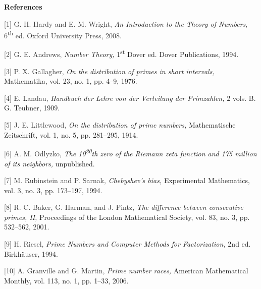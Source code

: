 \documentclass{article}
\begin{document}
\begin{flushleft}
\textbf{References}
\vspace{1\baselineskip}

\textcolor[HTML]{333333}{[1] G. H. Hardy and E. M. Wright, }\textit{An Introduction to the Theory of Numbers}\textcolor[HTML]{333333}{, 6\textsuperscript{th} ed. Oxford University Press, 2008. }

\vspace{1\baselineskip}

\textcolor[HTML]{333333}{[2] G. E. Andrews, }\textit{Number Theory, }1\textsuperscript{st} Dover ed. Dover Publications, 1994.

\vspace{1\baselineskip}

\textcolor[HTML]{333333}{[3] P. X. Gallagher, }\textit{On the distribution of primes in short intervals,} Mathematika, vol. 23, no. 1, pp. 4–9, 1976.

\vspace{1\baselineskip}

\textcolor[HTML]{333333}{[4] E. Landau, }\textit{Handbuch der Lehre von der Verteilung der Primzahlen,} 2 vols. B. G. Teubner, 1909.

\vspace{1\baselineskip}

\textcolor[HTML]{333333}{[5] J. E. Littlewood, }\textit{On the distribution of prime numbers,} Mathematische Zeitschrift, vol. 1, no. 5, pp. 281–295, 1914.

\vspace{1\baselineskip}

\textcolor[HTML]{333333}{[6] A. M. Odlyzko, }\textit{The 10\textsuperscript{20}th zero of the Riemann zeta function and 175 million of its neighbors,} unpublished.

\vspace{1\baselineskip}

\textcolor[HTML]{333333}{[7] M. Rubinstein and P. Sarnak, }\textit{Chebyshev’s bias,} Experimental Mathematics, vol. 3, no. 3, pp. 173–197, 1994.

\vspace{1\baselineskip}

\textcolor[HTML]{333333}{[8] R. C. Baker, G. Harman, and J. Pintz, }\textit{The difference between consecutive primes, II,} Proceedings of the London Mathematical Society, vol. 83, no. 3, pp. 532–562, 2001.

\vspace{1\baselineskip}

\textcolor[HTML]{333333}{[9] H. Riesel, }\textit{Prime Numbers and Computer Methods for Factorization,} 2nd ed. Birkhäuser, 1994.

\vspace{1\baselineskip}

\textcolor[HTML]{333333}{[10] A. Granville and G. Martin, }\textit{Prime number races,} American Mathematical Monthly, vol. 113, no. 1, pp. 1–33, 2006.

\end{flushleft}
\end{document}
